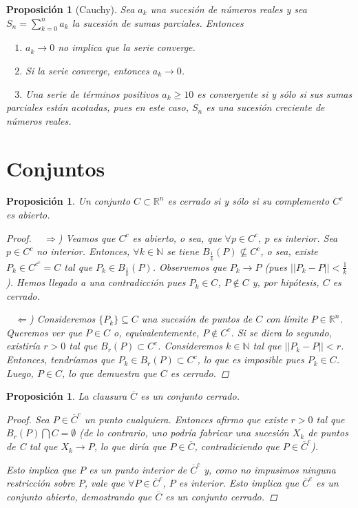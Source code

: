 \documentclass[]{article}
\newtheorem{prop}[teo]{Proposición}
\def\N{\mathbb{N}}
\def\R{\mathbb{R}}
\begin{document}
\begin{prop}[Cauchy]
	Sea $a_k$ una sucesión de números reales y sea $\displaystyle S_n = \sum_{k=0}^{n}a_k$ la sucesión de sumas parciales. Entonces

	~\newline
	$1.$ $a_k\to 0$ no implica que la serie converge.
	
	~\newline
	$2.$ Si la serie converge, entonces $a_k \to 0$.
	
	~\newline
	$3.$ Una serie de términos positivos $a_k \geq1 0$ es convergente si y sólo si sus sumas parciales están acotadas, pues en este caso, $S_n$ es una sucesión creciente de números reales.
\end{prop}

\newpage
\section{Conjuntos}
\begin{prop}
	Un conjunto $C \subset \R^n$ es cerrado si y sólo si su complemento $C^c$ es abierto.
	\begin{proof}
		~\newline
		$\Rightarrow$) Veamos que $C^c$ es abierto, o sea, que $\forall p \in C^c,\ p$ es interior. Sea $p \in C^c$ no interior. Entonces, $\forall k \in \N$ se tiene $B_{\frac{1}{k}}(P) \not\subseteq C^c$, o sea, existe $P_k \in C^{c^c} = C$ tal que $P_k \in B_{\frac{1}{k}}(P)$. Observemos que $P_k \rightarrow P$ (pues $||P_k - P|| < \frac{1}{k}$). 
		Hemos llegado a una contradicción pues $P_k \in C$, $P \not\in C$ y, por hipótesis, $C$ es cerrado.

		~\newline
		$\Leftarrow$) Consideremos $\{P_k\} \subseteq C$ una sucesión de puntos de $C$ con límite $P \in \R^n$. Queremos ver que $P \in C$ o, equivalentemente, $P \not\in C^c$. Si se diera lo segundo, existiría $r > 0$ tal que $B_r(P) \subset C^c$. Consideremos $k \in \N$ tal que $||P_k - P|| < r$. Entonces, tendríamos que $P_k \in B_r(P) \subset C^c$, lo que es imposible pues $P_k \in C$. Luego, $P \in C$, lo que demuestra que $C$ es cerrado.
	\end{proof}
\end{prop}

\begin{prop}
	La clausura $\overline{C}$ es un conjunto cerrado.
	\begin{proof}
		Sea $P \in \overline{C}^c$ un punto cualquiera. Entonces afirmo que existe $r > 0$ tal que $B_r(P) \bigcap C = \emptyset$ (de lo contrario, uno podría fabricar una sucesión $X_k$ de puntos de C tal que $X_k \rightarrow P$, lo que diría que $P \in \overline{C}$, contradiciendo que $P \in \overline{C}^c$). 
		
		Esto implica que $P$ es un punto interior de $\overline{C}^c$ y, como no impusimos ninguna restricción sobre $P$, vale que $\forall P \in \overline{C}^c$, $P$ es interior. Esto implica que $\overline{C}^c$ es un conjunto abierto, demostrando que $\overline{C}$ es un conjunto cerrado.
	\end{proof}
\end{prop}
\end{document}
